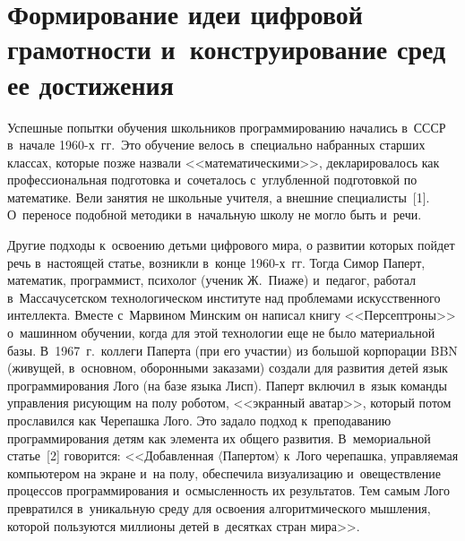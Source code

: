   
  
\vspace*{-2pt}



\thispagestyle{headings}

\begin{multicols}{2}

\label{st\stat}
  
\section{Формирование идеи цифровой грамотности 
и~конструирование сред ее достижения}

\vspace*{-6pt}

  Успешные попытки обучения школьников программированию начались 
  в~СССР в~начале 1960-х~гг.\ Это обучение велось в~специально набранных 
старших классах, которые позже назвали <<математическими>>, 
декларировалось как профессиональная подготовка и~сочеталось 
с~углубленной подготовкой по математике. Вели занятия не школьные учителя, 
а внешние специалисты~[1]. О~переносе подобной методики в~начальную 
школу не могло быть и~речи. 
  
  Другие подходы к~освоению детьми цифрового мира, о развитии которых 
пойдет речь в~настоящей статье, возникли в~конце 1960-х~гг. Тогда Симор 
Паперт, математик, программист, психолог (ученик Ж.~Пиаже) и~педагог, 
работал в~Массачусетском технологическом институте над проблемами 
искусственного интеллекта. Вместе с~Марвином Минским он написал книгу 
<<Персептроны>> о~машинном обучении, когда для этой технологии еще не 
было материальной базы. В~1967~г.\ коллеги Паперта (при его участии) из 
большой корпорации BBN (живущей, в~основном, оборонными заказами) 
создали для развития детей язык программирования Лого (на базе языка 
Лисп). Паперт включил в~язык команды управления рисующим на полу 
роботом, <<экранный аватар>>, который потом прославился как Черепашка 
Лого. Это задало подход к~преподаванию программирования детям как 
элемента их общего развития. В~мемориальной статье~[2] говорится: 
<<Добавленная $\langle$Папертом$\rangle$ к~Лого черепашка, управляемая 
компьютером на экране и~на полу, обеспечила визуализацию и~овеществление 
процессов программирования и~осмыс\-лен\-ность их результатов. Тем самым 
Лого превратился в~уникальную среду для освоения алгоритмического 
мышления, которой пользуются миллионы детей в~десятках стран мира>>.
  

\end{multicols}

